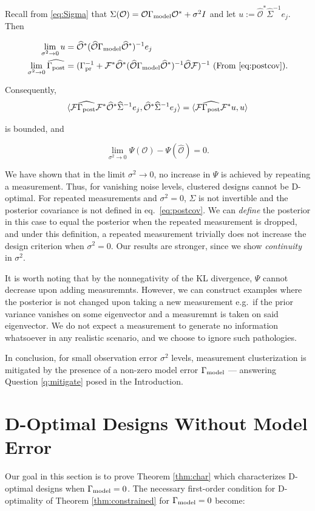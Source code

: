 \documentclass[ba]{imsart}
\newcommand{\obs}{\mathcal{O}}
\newcommand{\fwd}{\mathcal{F}}
\newcommand{\obsm}{\widehat{\obs}}
\newcommand{\Sigmam}{\widehat{\Sigma}}
\newcommand{\postcovm}{\widehat{\Gamma_{\textup{post}}}}
\newcommand{\tar}{\Psi}
\theoremstyle{plain}
\theoremstyle{definition}
\theoremstyle{remark}
\begin{document}
Recall from \eqref{eq:Sigma} that $\Sigma(\obs) = \obs
\modcov \obs^* + \sigma^2I$ and let $u := \obsm^*
\Sigmam^{-1}e_j$. Then

\begin{align*}
  \begin{split}
    \lim_{\sigma^2 \to 0} u &= \obsm^*(\obsm \modcov \obsm^*)^{-1}e_j\\
    \lim_{\sigma^2 \to 0} \postcovm &= (\prcov^{-1} + \fwd^* \obsm^* (\obsm \modcov \obsm^*)^{-1} \obsm \fwd)^{-1} \text{ (From \eqref{eq:postcov})}.
  \end{split}
\end{align*}

Consequently, 
\begin{equation*}
   \langle \fwd \postcovm \fwd^* \obsm^* \Sigmam^{-1}
    e_j, \obsm^* \Sigmam^{-1}e_j \rangle 
= \langle \fwd \postcovm \fwd^* u, u \rangle
\end{equation*}

is bounded, and

\begin{equation*}
\lim_{\sigma^2 \to 0} \tar(\obs) -\tar(\obsm) = 0.
\end{equation*}

We have shown that in the limit $\sigma^2 \to 0$, no increase in
$\tar$ is achieved by repeating a measurement. Thus, for vanishing
noise levels, clustered designs cannot be D-optimal. For repeated
measurements and $\sigma^2=0$, $\Sigma$ is not invertible and the
posterior covariance is not defined in eq.~\eqref{eq:postcov}. We can
\emph{define} the posterior in this case to equal the posterior when
the repeated measurement is dropped, and under this definition, a
repeated measurement trivially does not increase the design criterion
when $\sigma^2=0$. Our results are stronger, since we show
\emph{continuity} in $\sigma^2$.

It is worth noting that by the nonnegativity of the KL divergence,
$\tar$ cannot decrease upon adding measuremnts. However, we can
construct examples where the posterior is not changed upon taking a
new measurement e.g.~if the prior variance vanishes on some
eigenvector and a measuremnt is taken on said eigenvector. We do not
expect a measurement to generate no information whatsoever in any
realistic scenario, and we choose to ignore such pathologies.

In conclusion, for small observation error $\sigma^2$ levels,
measurement clusterization is mitigated by the presence of a non-zero
model error $\Gamma_{\textup{model}}$ --- answering Question \ref{q:mitigate} posed in
the Introduction. \section{D-Optimal Designs Without Model Error}\label{section:vanishing}
Our goal in this section is to prove Theorem \ref{thm:char} which
characterizes D-optimal designs when $\Gamma_{\textup{model}} = 0$. The necessary
first-order condition for D-optimality of Theorem
\ref{thm:constrained} for $\Gamma_{\textup{model}} = 0$ become:
\end{document}
